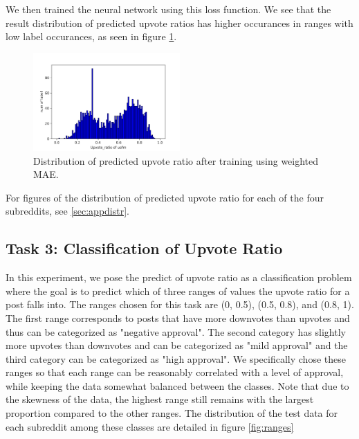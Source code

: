 \documentclass[11pt,a4paper]{article}
\let\Oldsubsection\subsection
\renewcommand{\subsection}{\FloatBarrier\Oldsubsection}
\begin{document}
    We then trained the neural network using this loss function. We see that the result distribution of predicted upvote ratios has higher occurances in ranges with low label occurances, as seen in figure \ref{fig:task2_after}.
    

    \begin{figure}
        \includegraphics[width=0.5\textwidth]{uofm_task2pred_smooth.png}
        \caption{Distribution of predicted upvote ratio after training using weighted MAE.}
        \label{fig:task2_after}
    \end{figure}

    For figures of the distribution of predicted upvote ratio for each of the four subreddits, see \ref{sec:appdistr}.

    \Oldsubsection{Task 3: Classification of Upvote Ratio}
        In this experiment, we pose the predict of upvote ratio as a classification problem where the goal is to predict which of three ranges of values the upvote ratio for a post falls into. The ranges chosen for this task are (0, 0.5), (0.5, 0.8), and (0.8, 1). The first range corresponds to posts that have more downvotes than upvotes and thus can be categorized as "negative approval". The second category has slightly more upvotes than downvotes and can be categorized as "mild approval" and the third category can be categorized as "high approval". We specifically chose these ranges so that each range can be reasonably correlated with a level of approval, while keeping the data somewhat balanced between the classes. Note that due to the skewness of the data, the highest range still remains with the largest proportion compared to the other ranges. The distribution of the test data for each subreddit among these classes are detailed in figure \ref{fig:ranges}
\end{document}
